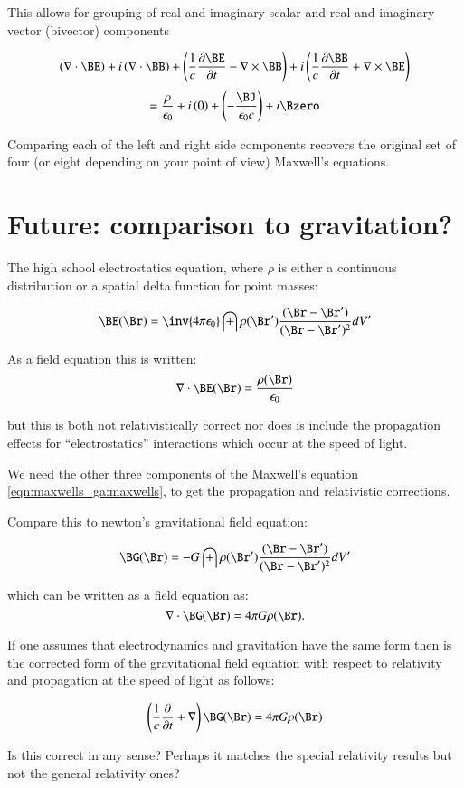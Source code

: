 This allows for grouping of real and imaginary scalar and real and imaginary vector (bivector) components

\[
   \left(\nabla \cdot \BE\right) + i\left(\nabla \cdot \BB\right)
+
   \left(\frac{1}{c} \frac{\partial \BE}{\partial t} - \nabla \times \BB\right)
+ i\left(\frac{1}{c} \frac{\partial \BB}{\partial t} + \nabla \times \BE\right)
\]
\[
= \frac{\rho}{\epsilon_0} + i\left(0\right) + \left(-\frac{\BJ}{\epsilon_0 c}\right) + i \Bzero
\]

Comparing each of the left and right side components recovers the original set of four (or eight depending on your point of view) Maxwell's equations.

\section{Future: comparison to gravitation?}


The high school electrostatics equation, where $\rho$ is either a continuous distribution or a spatial delta function for point masses:

\[
\BE(\Br) = \inv{4 \pi \epsilon_0}\int{\rho(\Br') \frac{(\Br -\Br')}{(\Br -\Br')^2}}dV'
\]

As a field equation this is written:
\[
\nabla \cdot \BE(\Br) = \frac{\rho(\Br)}{\epsilon_0}
\]

but this is both not relativistically correct nor does is 
include the propagation effects for ``electrostatics'' interactions
which occur at the speed of light.

We need the other three components of the Maxwell's 
equation \ref{eqn:maxwells_ga:maxwells}, to get the propagation and relativistic
corrections.

Compare this to newton's gravitational field equation:

\[
\BG(\Br) = -G\int{\rho(\Br') \frac{(\Br -\Br')}{(\Br -\Br')^2}}dV'
\]


which can be written as a field equation as:
\[
\nabla \cdot \BG(\Br) = 4\pi G \rho(\Br).
\]

If one assumes that electrodynamics and gravitation
have the same form then is the corrected form of the gravitational field
equation with respect to relativity and propagation at the speed of light
as follows:

\begin{equation}\label{eqn:maxwells_ga:maybegravityfield}
\left(\frac{1}{c} \frac{\partial}{\partial t} + \nabla\right)\BG(\Br) = 
4 \pi G \rho(\Br)
\end{equation}

Is this correct in any sense?  Perhaps it matches the special relativity results
but not the general relativity ones?
